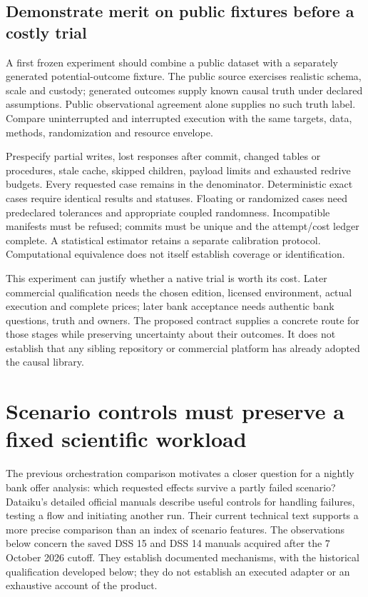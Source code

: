 \subsection{Demonstrate merit on public fixtures before a costly trial}

A first frozen experiment should combine a public dataset with a separately
generated potential-outcome fixture. The public source exercises realistic
schema, scale and custody; generated outcomes supply known causal truth under
declared assumptions. Public observational agreement alone supplies no such
truth label. Compare uninterrupted and interrupted execution with the same
targets, data, methods, randomization and resource envelope.

Prespecify partial writes, lost responses after commit, changed tables or
procedures, stale cache, skipped children, payload limits and exhausted redrive
budgets. Every requested case remains in the denominator. Deterministic exact
cases require identical results and statuses. Floating or randomized cases
need predeclared tolerances and appropriate coupled randomness. Incompatible
manifests must be refused; commits must be unique and the attempt/cost ledger
complete. A statistical estimator retains a separate calibration protocol.
Computational equivalence does not itself establish coverage or identification.

This experiment can justify whether a native trial is worth its cost. Later
commercial qualification needs the chosen edition, licensed environment,
actual execution and complete prices; later bank acceptance needs authentic
bank questions, truth and owners. The proposed contract supplies a concrete
route for those stages while preserving uncertainty about their outcomes.
It does not establish that any sibling repository or commercial platform has
already adopted the causal library.


\section{Scenario controls must preserve a fixed scientific workload}
\label{exec23:dss-scope}

The previous orchestration comparison motivates a closer question for a
nightly bank offer analysis: which requested effects survive a partly failed
scenario? Dataiku's detailed official manuals describe useful controls for
handling failures, testing a flow and initiating another run. Their current
technical text supports a more precise comparison than an index of scenario
features. The observations below concern the saved DSS 15 and DSS 14 manuals
acquired after the 7 October 2026 cutoff. They establish documented mechanisms,
with the historical qualification developed below; they do not establish an
executed adapter or an exhaustive account of the product.
\citep{exec23_dss_latest_flow,exec23_dss_latest_triggers,exec23_dss_latest_steps,
exec23_dss_dss14_flow}

